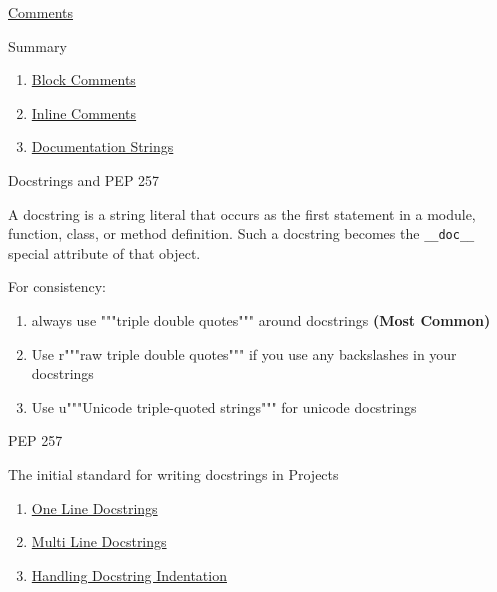 \documentclass{beamer}
\begin{document}
\begin{frame}{\href{https://www.python.org/dev/peps/pep-0008/\#comments}{Comments}}

Summary

\begin{enumerate}
\item \href{https://www.python.org/dev/peps/pep-0008/\#block-comments}{Block Comments}
\item \href{https://www.python.org/dev/peps/pep-0008/\#inline-comments}{Inline Comments}
\item \href{https://www.python.org/dev/peps/pep-0008/\#documentation-strings}{Documentation Strings}
\end{enumerate}

\end{frame}



\begin{frame}{Docstrings and PEP 257}

A docstring is a string literal that occurs as the first statement in a module, function, class, 
or method definition. Such a docstring becomes the \texttt{__doc__} special attribute of that object.

  For consistency:

  \begin{enumerate}
    \item always use """triple double quotes""" around docstrings \textbf{(Most Common)}
    \item Use r"""raw triple double quotes""" if you use any backslashes in your docstrings 
    \item Use u"""Unicode triple-quoted strings""" for unicode docstrings
  \end{enumerate}

\end{frame}

\begin{frame}{PEP 257}

The initial standard for writing docstrings in Projects

\begin{enumerate}
\item \href{https://www.python.org/dev/peps/pep-0257/\#one-line-docstrings}{One Line Docstrings}
\item \href{https://www.python.org/dev/peps/pep-0257/\#multi-line-docstrings}{Multi Line Docstrings}
\item \href{https://www.python.org/dev/peps/pep-0257/\#handling-docstring-indentation}{Handling Docstring Indentation}
\end{enumerate}

\end{frame}
\end{document}
